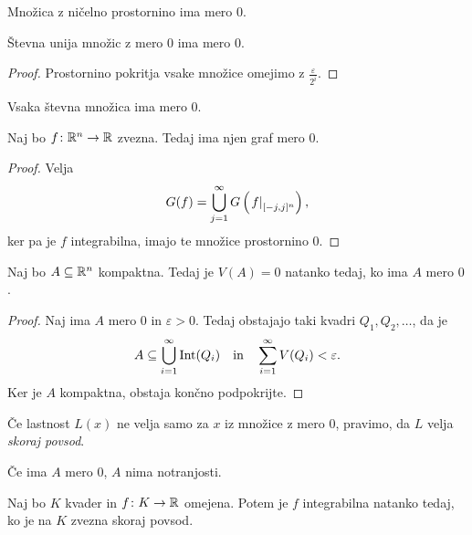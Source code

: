 \begin{opomba}
Množica z ničelno prostornino ima mero $0$.
\end{opomba}

\begin{trditev}
Števna unija množic z mero $0$ ima mero $0$.
\end{trditev}

\begin{proof}
Prostornino pokritja vsake množice omejimo z
$\frac{\varepsilon}{2^i}$.
\end{proof}

\begin{posledica}
Vsaka števna množica ima mero $0$.
\end{posledica}

\begin{posledica}
Naj bo $f \colon \mathbb{R}^n \to \mathbb{R}$ zvezna. Tedaj ima njen graf mero $0$.
\end{posledica}

\begin{proof}
Velja
\[
G(f) = \bigcup_{j=1}^\infty G\left(\left. f\right|_{[-j,j]^n}^{}\right),
\]
ker pa je $f$ integrabilna, imajo te množice prostornino $0$.
\end{proof}

\begin{trditev}
Naj bo $A \subseteq \mathbb{R}^n$ kompaktna. Tedaj je $V(A) = 0$ natanko
tedaj, ko ima $A$ mero $0$.
\end{trditev}

\begin{proof}
Naj ima $A$ mero $0$ in $\varepsilon > 0$. Tedaj obstajajo taki
kvadri $Q_1,Q_2,\dots$, da je
\[
A \subseteq \bigcup_{i=1}^\infty \operatorname{Int}(Q_i)
\quad \text{in} \quad
\sum_{i=1}^\infty V(Q_i) < \varepsilon.
\]
Ker je $A$ kompaktna, obstaja končno podpokrijte.
\end{proof}

\begin{definicija}
Če lastnost $L(x)$ ne velja samo za $x$ iz množice z mero $0$,
pravimo, da $L$ velja \emph{skoraj povsod}.
\end{definicija}

\begin{opomba}
Če ima $A$ mero $0$, $A$ nima notranjosti.
\end{opomba}

\begin{izrek}[Lebesque]
Naj bo $K$ kvader in $f \colon K \to \mathbb{R}$ omejena. Potem je $f$
integrabilna natanko tedaj, ko je na $K$ zvezna skoraj povsod.
\end{izrek}

